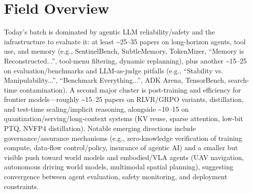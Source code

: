 \documentclass[12pt,letterpaper]{article}
\begin{document}
\medskip



\section*{Field Overview}
{\footnotesize Today's batch is dominated by agentic LLM reliability/safety and the infrastructure to evaluate it: at least \textasciitilde{}25--35 papers on long-horizon agents, tool use, and memory (e.g., SentinelBench, SubtleMemory, TokenMizer, ``Memory is Reconstructed...'', tool-menu filtering, dynamic replanning), plus another \textasciitilde{}15--25 on evaluation/benchmarks and LLM-as-judge pitfalls (e.g., ``Stability vs. Manipulability...'', ``Benchmark Everything...'', ADK Arena, TensorBench, search-time contamination). A second major cluster is post-training and efficiency for frontier models---roughly \textasciitilde{}15--25 papers on RLVR/GRPO variants, distillation, and test-time scaling/implicit reasoning, alongside \textasciitilde{}10--15 on quantization/serving/long-context systems (KV reuse, sparse attention, low-bit PTQ, NVFP4 distillation). Notable emerging directions include governance/assurance mechanisms (e.g., zero-knowledge verification of training compute, data-flow control/policy, insurance of agentic AI) and a smaller but visible push toward world models and embodied/VLA agents (UAV navigation, autonomous driving world models, multimodal spatial planning), suggesting convergence between agent evaluation, safety monitoring, and deployment constraints.}
\end{document}
